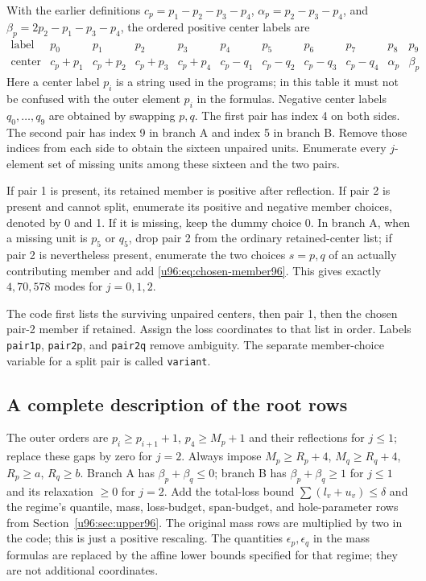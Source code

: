 \documentclass[11pt,a4paper]{article}
\theoremstyle{remark}
\begin{document}
With the earlier definitions $c_p=p_1-p_2-p_3-p_4$,
$\alpha_p=p_2-p_3-p_4$, and
$\beta_p=2p_2-p_1-p_3-p_4$, the ordered positive center labels are
\[
 \begin{array}{c|cccccccccc}
 \text{label}&p_0&p_1&p_2&p_3&p_4&p_5&p_6&p_7&p_8&p_9\\\hline
 \text{center}&c_p+p_1&c_p+p_2&c_p+p_3&c_p+p_4&
 c_p-q_1&c_p-q_2&c_p-q_3&c_p-q_4&\alpha_p&\beta_p
 \end{array}
\]
Here a center label $p_i$ is a string used in the programs; in this table
it must not be confused with the outer element $p_i$ in the formulas.
Negative center labels $q_0,\ldots,q_9$ are obtained by swapping $p,q$.
The first pair has index 4 on both sides. The second pair has index 9 in
branch A and index 5 in branch B. Remove those indices from each side
to obtain the sixteen unpaired units. Enumerate every $j$-element set
of missing units among these sixteen and the two pairs.

If pair 1 is present, its retained member is positive after reflection.
If pair 2 is present and cannot split, enumerate its positive and negative
member choices, denoted by 0 and 1. If it is missing, keep the dummy choice
0. In branch A, when a missing unit is $p_5$ or $q_5$, drop pair 2 from
the ordinary retained-center list; if pair 2 is nevertheless present,
enumerate the two choices $s=p,q$ of an actually contributing member and
add \eqref{u96:eq:chosen-member96}. This gives exactly $4,70,578$ modes for
$j=0,1,2$.

The code first lists the surviving unpaired centers, then pair 1, then
the chosen pair-2 member if retained. Assign the loss coordinates to that
list in order. Labels \texttt{pair1p}, \texttt{pair2p}, and
\texttt{pair2q} remove ambiguity. The separate member-choice variable
for a split pair is called \texttt{variant}.

\subsection{A complete description of the root rows}
The outer orders are $p_i\geq p_{i+1}+1$, $p_4\geq M_p+1$ and their
reflections for $j\leq1$; replace these gaps by zero for $j=2$.
Always impose $M_p\geq R_p+4$, $M_q\geq R_q+4$,
$R_p\geq a$, $R_q\geq b$.
Branch A has $\beta_p+\beta_q\leq0$; branch B has
$\beta_p+\beta_q\geq1$ for $j\leq1$ and its relaxation $\geq0$ for $j=2$.
Add the total-loss bound $\sum(l_v+u_v)\leq\delta$ and the regime's
quantile, mass, loss-budget, span-budget, and hole-parameter rows from
Section~\ref{u96:sec:upper96}. The original mass rows are multiplied by two
in the code; this is just a positive rescaling. The quantities
$\epsilon_p,\epsilon_q$ in the mass formulas are replaced by the affine
lower bounds specified for that regime; they are not additional coordinates.
\end{document}
